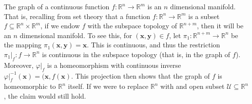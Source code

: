 \documentclass{article}                                                        %
\begin{document}
        \begin{example}
            The graph of a continuous function
            $f:\mathbb{R}^{n}\rightarrow\mathbb{R}^{m}$ is an $n$ dimensional
            manifold. That is, recalling from set theory that a function
            $f:\mathbb{R}^{n}\rightarrow\mathbb{R}^{m}$ is a subset
            $f\subseteq\mathbb{R}^{n}\times\mathbb{R}^{m}$, if we endow $f$ with
            the subspace topology of $\mathbb{R}^{n+m}$, then it will be an
            $n$ dimensional manifold. To see this, for
            $(\mathbf{x},\mathbf{y})\in{f}$, let
            $\pi_{1}:\mathbb{R}^{n+m}\rightarrow\mathbb{R}^{n}$ be the mapping
            $\pi_{1}(\mathbf{x},\mathbf{y})=\mathbf{x}$. This is continuous, and
            thus the restriction $\pi_{1}|_{f}:f\rightarrow\mathbb{R}^{n}$ is
            continuous in the subspace topology (that is, in the graph of $f$).
            Moreover, $\varphi|_{f}$ is a homeomorphism with continuous inverse
            $\varphi|_{f}^{\minus{1}}(\mathbf{x})=(\mathbf{x},f(\mathbf{x})$.
            This projection then shows that the graph of $f$ is homeomorphic to
            $\mathbb{R}^{n}$ itself. If we were to replace $\mathbb{R}^{n}$ with
            and open subset $\mathcal{U}\subseteq\mathbb{R}^{n}$, the claim
            would still hold.
        \end{example}
\end{document}
